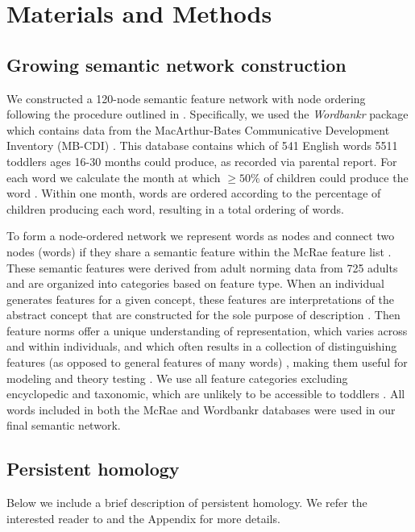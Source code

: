 \documentclass{article}
\begin{document}
\section*{Materials and Methods}


\subsection*{Growing semantic network construction}
We constructed a 120-node semantic feature network with node ordering following the procedure outlined in \cite{hills2009longitudinal}. Specifically, we used the \textit{Wordbankr} package \cite{frank2016wordbank} which contains data from the MacArthur-Bates Communicative Development Inventory (MB-CDI) \cite{dale1996lexical}. This database contains which of 541 English words 5511 toddlers ages 16-30 months could produce, as recorded via parental report. For each word we calculate the month at which $\geq 50\%$ of children could produce the word \cite{hills2009longitudinal}. Within one month, words are ordered according to the percentage of children producing each word, resulting in a total ordering of words.

To form a node-ordered network we represent words as nodes and connect two nodes (words) if they share a semantic feature within the McRae feature list \cite{mcrae2005semantic}. These semantic features were derived from adult norming data from 725 adults and are organized into categories based on feature type. When an individual generates features for a given concept, these features are interpretations of the abstract concept that are constructed for the sole purpose of description \cite{barsalou2003abstraction}. Then feature norms offer a unique understanding of representation, which varies across and within individuals, and which often results in a collection of distinguishing features (as opposed to general features of many words) \cite{mcrae2005semantic}, making them useful for modeling and theory testing \cite{hampton1979polymorphous,wu2009perceptual,devlin1998category,moss2002emergence}. We use all feature categories excluding encyclopedic and taxonomic, which are unlikely to be accessible to toddlers \cite{hills2009longitudinal}. All words included in both the McRae and Wordbankr databases were used in our final semantic network.


\subsection*{Persistent homology}
Below we include a brief description of persistent homology. We refer the interested reader to \cite{carlsson2009topology,zomorodian2005computing,ghrist2008barcodes} and the Appendix for more details.
\end{document}
